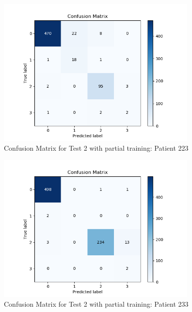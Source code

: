 \documentclass[LaM,binding=0.6cm]{sapthesis}
\begin{document}
\begin{figure}  \centering
    \includegraphics[width=100mm,scale=0.7]{patient223-transfer-learn-nontrainable}
    \caption{Confusion Matrix for Test 2 with partial training: Patient 223}
    \label{fig:patient223-transfer-learn-nontrainable}
\end{figure}
\begin{figure}  \centering
    \includegraphics[width=100mm,scale=0.7]{patient233-transfer-learn-nontrainable}
    \caption{Confusion Matrix for Test 2 with partial training: Patient 233}
    \label{fig:patient233-transfer-learn-nontrainable}
\end{figure}
\end{document}
